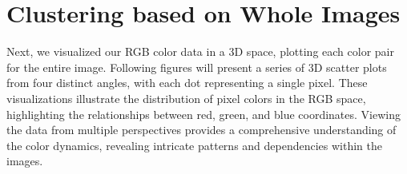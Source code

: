 \documentclass{article}
\begin{document}
\hypertarget{clustering-based-on-whole-images}{%
\section{Clustering based on Whole
Images}\label{clustering-based-on-whole-images}}

Next, we visualized our RGB color data in a 3D space, plotting each
color pair for the entire image. Following figures will present a series
of 3D scatter plots from four distinct angles, with each dot
representing a single pixel. These visualizations illustrate the
distribution of pixel colors in the RGB space, highlighting the
relationships between red, green, and blue coordinates. Viewing the data
from multiple perspectives provides a comprehensive understanding of the
color dynamics, revealing intricate patterns and dependencies within the
images.

\newpage
\end{document}
